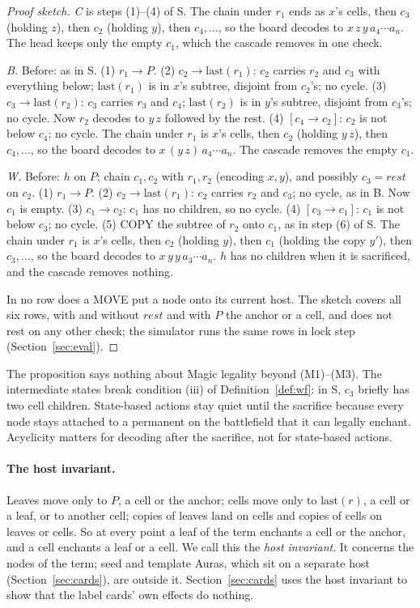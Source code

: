 \documentclass[11pt]{article}
\theoremstyle{definition}
\newcommand{\last}{\mathrm{last}}
\newcommand{\rest}{\mathit{rest}}
\newcommand{\mv}{\to}
\begin{document}
\begin{proof}[Proof sketch]
\emph{C} is steps (1)--(4) of S. The chain under $r_1$ ends as $x$'s cells, then $c_3$
(holding $z$), then $c_2$ (holding $y$), then $c_4,\dots$, so the board decodes to
$x\,z\,y\,a_4\cdots a_n$. The head keeps only the empty $c_1$, which the cascade removes
in one check.

\emph{B.} Before: as in S. (1) $r_1\mv P$. (2) $c_2\mv\last(r_1)$: $c_2$ carries $r_2$ and
$c_3$ with everything below; $\last(r_1)$ is in $x$'s subtree, disjoint from $c_2$'s; no
cycle. (3) $c_3\mv\last(r_2)$: $c_3$ carries $r_3$ and $c_4$; $\last(r_2)$ is in $y$'s
subtree, disjoint from $c_3$'s; no cycle. Now $r_2$ decodes to $y\,z$ followed by the rest.
(4) $[c_4\mv c_2]$: $c_2$ is not below $c_4$; no cycle. The chain under $r_1$ is $x$'s
cells, then $c_2$ (holding $y\,z$), then $c_4,\dots$, so the board decodes to
$x\,(y\,z)\,a_4\cdots a_n$. The cascade removes the empty $c_1$.

\emph{W.} Before: $h$ on $P$; chain $c_1,c_2$ with $r_1,r_2$ (encoding $x,y$), and possibly
$c_3=\rest$ on $c_2$. (1) $r_1\mv P$. (2) $c_2\mv\last(r_1)$: $c_2$ carries $r_2$ and
$c_3$; no cycle, as in B. Now $c_1$ is empty. (3) $c_1\mv c_2$: $c_1$ has no children, so
no cycle. (4) $[c_3\mv c_1]$: $c_1$ is not below $c_3$; no cycle. (5) COPY the subtree of
$r_2$ onto $c_1$, as in step (6) of S. The chain under $r_1$ is $x$'s cells, then $c_2$
(holding $y$), then $c_1$ (holding the copy $y'$), then $c_3,\dots$, so the board decodes
to $x\,y\,y\,a_3\cdots a_n$. $h$ has no children when it is sacrificed, and the cascade
removes nothing.

In no row does a MOVE put a node onto its current host. The sketch covers all six rows,
with and without $\rest$ and with $P$ the anchor or a cell, and does not rest on any
other check; the simulator runs the same rows in lock step (Section~\ref{sec:eval}).
\end{proof}

The proposition says nothing about Magic legality beyond (M1)--(M3). The intermediate
states break condition (iii) of Definition~\ref{def:wf}: in S, $c_3$ briefly has two cell
children. State-based actions stay quiet until the sacrifice because every node stays
attached to a permanent on the battlefield that it can legally enchant. Acyclicity matters
for decoding after the sacrifice, not for state-based actions.

\paragraph{The host invariant.} Leaves move only to $P$, a cell or the anchor; cells
move only to $\last(r)$, a cell or a leaf, or to another cell; copies of leaves land on
cells and copies of cells on leaves or cells. So at every point a leaf of the term
enchants a cell or the anchor, and a cell enchants a leaf or a cell. We call this the
\emph{host invariant}. It concerns the nodes of the term; seed and template Auras, which
sit on a separate host (Section~\ref{sec:cards}), are outside it. Section~\ref{sec:cards}
uses the host invariant to show that the label cards' own effects do nothing.
\end{document}
